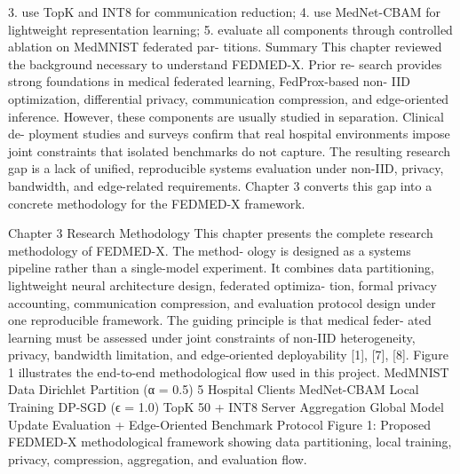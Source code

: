 3. use TopK and INT8 for communication reduction; 4. use MedNet-CBAM for lightweight representation learning; 5. evaluate all components through controlled ablation on MedMNIST federated par- titions.
Summary
This chapter reviewed the background necessary to understand FEDMED-X. Prior re- search provides strong foundations in medical federated learning, FedProx-based non-
IID optimization, differential privacy, communication compression, and edge-oriented inference. However, these components are usually studied in separation. Clinical de- ployment studies and surveys confirm that real hospital environments impose joint constraints that isolated benchmarks do not capture. The resulting research gap is a lack of unified, reproducible systems evaluation under non-IID, privacy, bandwidth, and edge-related requirements. Chapter 3 converts this gap into a concrete methodology for the FEDMED-X framework.

Chapter 3
Research Methodology
This chapter presents the complete research methodology of FEDMED-X. The method- ology is designed as a systems pipeline rather than a single-model experiment.
It combines data partitioning, lightweight neural architecture design, federated optimiza- tion, formal privacy accounting, communication compression, and evaluation protocol design under one reproducible framework. The guiding principle is that medical feder- ated learning must be assessed under joint constraints of non-IID heterogeneity, privacy, bandwidth limitation, and edge-oriented deployability [1], [7], [8].
Figure 1 illustrates the end-to-end methodological flow used in this project.
MedMNIST
Data
Dirichlet
Partition (α = 0.5) 5 Hospital
Clients
MedNet-CBAM
Local Training
DP-SGD (ϵ = 1.0)
TopK 50%
+ INT8
Server
Aggregation
Global Model
Update
Evaluation + Edge-Oriented
Benchmark Protocol
Figure 1: Proposed FEDMED-X methodological framework showing data partitioning, local training, privacy, compression, aggregation, and evaluation flow.

